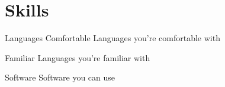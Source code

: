 
\section{Skills}
\begin{skillset}
    \skillboth
    {Languages}
    {Comfortable}
    {Languages you're comfortable with}

    \skillminor
    {Familiar}
    {Languages you're familiar with}

    \skillmajor
    {Software}
    {Software you can use}
\end{skillset}


